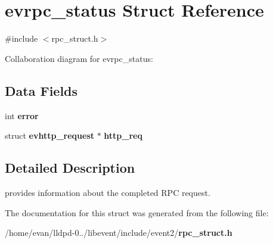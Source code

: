 \section{evrpc\-\_\-status \-Struct \-Reference}
\label{structevrpc__status}


{\ttfamily \#include $<$rpc\-\_\-struct.\-h$>$}



\-Collaboration diagram for evrpc\-\_\-status\-:
\subsection*{\-Data \-Fields}
\begin{DoxyCompactItemize}
\item 
int {\bfseries error}\label{structevrpc__status_a11614f44ef4d939bdd984953346a7572}

\item 
struct {\bf evhttp\-\_\-request} $\ast$ {\bfseries http\-\_\-req}\label{structevrpc__status_a02b843a8289c9d0e5ab09b1f747471d0}

\end{DoxyCompactItemize}


\subsection{\-Detailed \-Description}
provides information about the completed \-R\-P\-C request. 

\-The documentation for this struct was generated from the following file\-:\begin{DoxyCompactItemize}
\item 
/home/evan/lldpd-\/0../libevent/include/event2/{\bf rpc\-\_\-struct.\-h}\end{DoxyCompactItemize}
